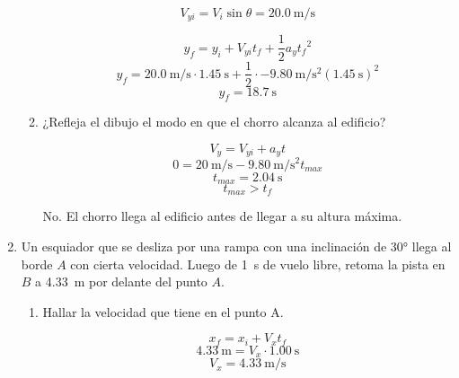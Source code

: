 \documentclass[../practica.root.tex]{subfiles}
\begin{document}
\begin{enumerate}
\begin{enumerate}
		            \[V_{yi}=V_i\sin{\theta}=\SI{20,0}{\meter\per\second}\]

		            \[y_f=y_i+V_{yi}t_f+\frac{1}{2}a_y{t_f}^2\]
		            \[y_f=\SI{20,0}{\meter\per\second}\cdot\SI{1,45}{\second}+\frac{1}{2}\cdot\SI{-9,80}{\meter\per\second\squared}(\SI{1,45}{\second})^2\]
		            \[y_f=\boxed{\SI{18,7}{\second}}\]

		      \item ¿Refleja el dibujo el modo en que el chorro alcanza al edificio?

		            \[V_y=V_{yi}+a_yt\]
		            \[0=\SI{20}{\meter\per\second}-\SI{9,80}{\meter\per\second\squared}t_{max}\]
		            \[t_{max}=\SI{2,04}{\second}\]
		            \[t_{max}>t_f\]

		            No. El chorro llega al edificio antes de llegar a su altura máxima.
	      \end{enumerate}

	\item Un esquiador que se desliza por una rampa con una inclinación de \ang{30} llega al borde $A$ con cierta velocidad. Luego de \SI{1}{\second} de vuelo libre, retoma la pista en $B$ a \SI{4,33}{\meter} por delante del punto $A$.

	      \begin{center}
	      \end{center}

	      \begin{enumerate}
		      \item Hallar la velocidad que tiene en el punto A.

		            \[x_f=x_i+V_xt_f\]
		            \[\SI{4,33}{\meter}=V_x\cdot\SI{1,00}{\second}\]
		            \[V_x=\SI{4,33}{\meter\per\second}\]


\end{enumerate}
\end{enumerate}
\end{document}
